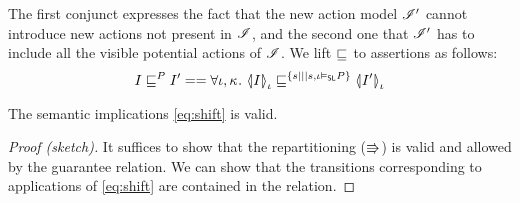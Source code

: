 The first conjunct expresses the fact that the new action model
$\lmod'$ cannot introduce new actions not present in $\lmod$, and the
second one that $\lmod'$ has to include all the visible potential
actions of $\lmod$. We lift $\weakenI{}$ to assertions as follows:
\[
I \weakenI{P} I' == \V{\lenv,\ca{}} \semI[\lenv]{I} \weakenI{\{s|||
  s,\lenv\slsat P\}} \semI[\lenv]{I'}
\]




\begin{lemma}
  The semantic implications \eqref{eq:shift} is valid.
\end{lemma}
\begin{proof}[Proof (sketch)]
  It suffices to show that the repartitioning ($\semimplies$) is valid
  and allowed by the guarantee relation. We can show that the transitions
  corresponding to applications of \eqref{eq:shift} are contained in
  the \shiftG relation.
\end{proof}

